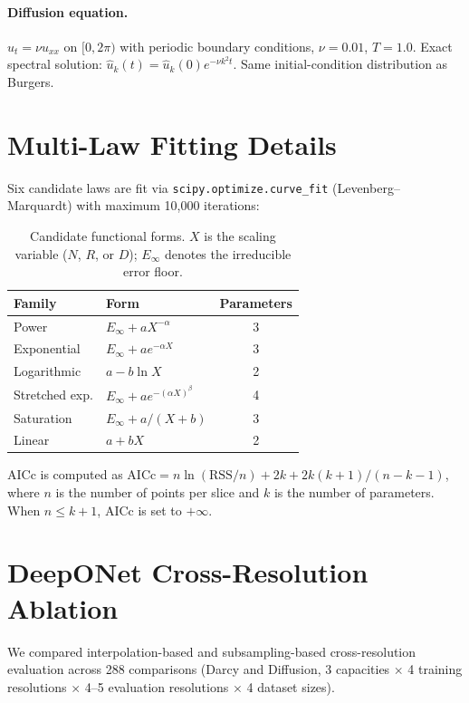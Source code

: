 \documentclass[11pt]{article}
\newcommand{\Einf}{E_\infty}
\begin{document}
\paragraph{Diffusion equation.}
$u_t = \nu u_{xx}$ on $[0, 2\pi)$ with periodic boundary conditions,
$\nu = 0.01$, $T = 1.0$. Exact spectral solution:
$\hat{u}_k(t) = \hat{u}_k(0) e^{-\nu k^2 t}$.
Same initial-condition distribution as Burgers.


\section{Multi-Law Fitting Details}
\label{app:fitting}

Six candidate laws are fit via \texttt{scipy.optimize.curve\_fit}
(Levenberg--Marquardt) with maximum 10{,}000 iterations:

\begin{table}[h]
\centering
\caption{Candidate functional forms. $X$ is the scaling variable
($N$, $R$, or $D$); $\Einf$ denotes the irreducible error floor.}
\label{tab:candidates}
\begin{tabular}{@{}llc@{}}
\toprule
\textbf{Family} & \textbf{Form} & \textbf{Parameters} \\
\midrule
Power       & $\Einf + a X^{-\alpha}$   & 3 \\
Exponential & $\Einf + a e^{-\alpha X}$ & 3 \\
Logarithmic & $a - b \ln X$             & 2 \\
Stretched exp. & $\Einf + a e^{-(\alpha X)^\beta}$ & 4 \\
Saturation  & $\Einf + a / (X + b)$     & 3 \\
Linear      & $a + b X$                 & 2 \\
\bottomrule
\end{tabular}
\end{table}

\noindent
AICc is computed as
$\mathrm{AICc} = n \ln(\mathrm{RSS}/n) + 2k + 2k(k+1)/(n-k-1)$,
where $n$ is the number of points per slice and $k$ is the number of
parameters. When $n \leq k + 1$, AICc is set to $+\infty$.


\section{DeepONet Cross-Resolution Ablation}
\label{app:deeponet-ablation}

We compared interpolation-based and subsampling-based cross-resolution
evaluation across 288 comparisons (Darcy and Diffusion, 3 capacities
$\times$ 4 training resolutions $\times$ 4--5 evaluation resolutions
$\times$ 4 dataset sizes).
\end{document}
